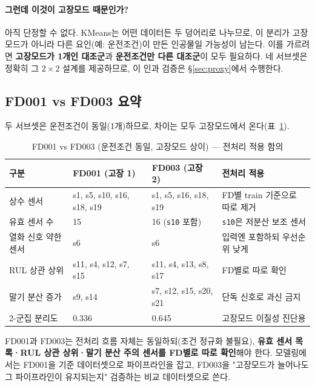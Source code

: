 \documentclass[11pt]{article}
\begin{document}
\paragraph{그런데 이것이 고장모드 때문인가?}
아직 단정할 수 없다.
KMeans는 어떤 데이터든 두 덩어리로 나누므로, 이 분리가 고장모드가 아니라 다른 요인(예: 운전조건)이 만든 인공물일 가능성이 남는다.
이를 가르려면 \textbf{고장모드가 1개인 대조군}과 \textbf{운전조건만 다른 대조군}이 모두 필요하다.
네 서브셋은 정확히 그 $2\times2$ 설계를 제공하므로, 이 인과 검증은 \S\ref{sec:proxy}에서 수행한다.

\subsection{FD001 vs FD003 요약}

두 서브셋은 운전조건이 동일(1개)하므로, 차이는 모두 고장모드에서 온다(표~\ref{tab:fd001v003}).

\begin{table}[H]
\centering
\caption{FD001 vs FD003 (운전조건 동일, 고장모드 상이) — 전처리 적용 함의}
\label{tab:fd001v003}
\begin{tabular}{p{2.8cm}p{3.6cm}p{3.6cm}p{4.0cm}}
\toprule
구분 & FD001 (고장 1) & FD003 (고장 2) & 전처리 적용 \\
\midrule
상수 센서 & s1, s5, s10, s16, s18, s19 & s1, s5, s16, s18, s19 & FD별 train 기준으로 따로 제거 \\
유효 센서 수 & 15 & 16 (\texttt{s10} 포함) & \texttt{s10}은 저분산 보조 센서 \\
열화 신호 약한 센서 & s6 & s6 & 입력엔 포함하되 우선순위 낮게 \\
RUL 상관 상위 & s11, s4, s12, s7, s15 & s11, s4, s13, s8, s17 & FD별로 따로 확인 \\
말기 분산 증가 & s9, s14 & s7, s12, s15, s20, s21 & 단독 신호로 과신 금지 \\
2-군집 분리도 & 0.336 & 0.645 & 고장모드 이질성 진단용 \\
\bottomrule
\end{tabular}
\end{table}

FD001과 FD003는 전처리 흐름 자체는 동일하되(조건 정규화 불필요), \textbf{유효 센서 목록·RUL 상관 상위·말기 분산 주의 센서를 FD별로 따로 확인}해야 한다.
모델링에서는 FD001을 기준 데이터셋으로 파이프라인을 잡고, FD003을 "고장모드가 늘어나도 그 파이프라인이 유지되는지" 검증하는 비교 데이터셋으로 쓴다.

\end{document}
